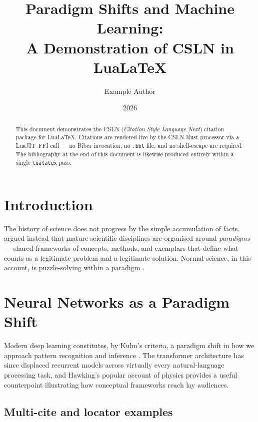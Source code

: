 \documentclass[12pt, a4paper]{article}
\title{Paradigm Shifts and Machine Learning:\\
       A Demonstration of CSLN in Lua\LaTeX}
\author{Example Author}
\date{2026}
\begin{document}
\maketitle

\begin{abstract}
This document demonstrates the CSLN (\textit{Citation Style Language Next})
citation package for Lua\LaTeX.
Citations are rendered live by the CSLN Rust processor via a LuaJIT~FFI
call --- no Biber invocation, no \texttt{.bbl} file, and no shell-escape
are required.
The bibliography at the end of this document is likewise produced entirely
within a single \texttt{lualatex} pass.
\end{abstract}

\section{Introduction}

The history of science does not progress by the simple accumulation of
facts.
\textcite{kuhn1962} argued instead that mature scientific disciplines are
organised around \emph{paradigms} --- shared frameworks of concepts,
methods, and exemplars that define what counts as a legitimate problem and
a legitimate solution.
Normal science, in this account, is puzzle-solving within a paradigm
\cite{kuhn1962}.

\section{Neural Networks as a Paradigm Shift}

Modern deep learning constitutes, by Kuhn's criteria, a paradigm shift
in how we approach pattern recognition and inference
\cite{lecun2015}.
The transformer architecture \cite{vaswani2017} has since displaced
recurrent models across virtually every natural-language processing task,
and Hawking's popular account of physics \cite{hawking1988} provides a
useful counterpoint illustrating how conceptual frameworks reach lay
audiences.

\subsection{Multi-cite and locator examples}
\end{document}
